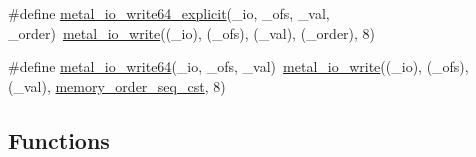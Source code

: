 \begin{DoxyCompactItemize}
\item 
\#define \hyperlink{group__io_ga84eb7098e98bde8c21f31839e86116f2}{metal\+\_\+io\+\_\+write64\+\_\+explicit}(\+\_\+io,  \+\_\+ofs,  \+\_\+val,  \+\_\+order)~\hyperlink{group__io_ga74ef56cd9b16bced8c2b8553956220b4}{metal\+\_\+io\+\_\+write}((\+\_\+io), (\+\_\+ofs), (\+\_\+val), (\+\_\+order), 8)
\item 
\#define \hyperlink{group__io_ga1adb221edbb652ebf3ca5ea3c9635a13}{metal\+\_\+io\+\_\+write64}(\+\_\+io,  \+\_\+ofs,  \+\_\+val)~\hyperlink{group__io_ga74ef56cd9b16bced8c2b8553956220b4}{metal\+\_\+io\+\_\+write}((\+\_\+io), (\+\_\+ofs), (\+\_\+val), \hyperlink{compiler_2gcc_2atomic_8h_a17c2de5ae768960284c047a320f17d1ba2d21914d1edd227a890107e7878a3752}{memory\+\_\+order\+\_\+seq\+\_\+cst}, 8)
\end{DoxyCompactItemize}
\subsection*{Functions}
